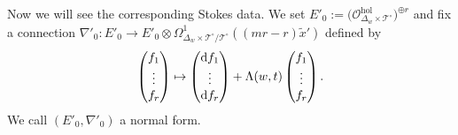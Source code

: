 \documentclass[pdftex]{sigma}
\numberwithin{equation}{section}
\begin{document}
Now we will see the corresponding Stokes data.
We set
$E'_0 :=
\big( {\mathcal O}_{\Delta_w\times {\mathcal T^{\circ}}}^{\mathrm{hol}}\big)^{\oplus r}$
and fix a connection
$\nabla'_0 \colon
E'_0 \longrightarrow E'_0 \otimes
\Omega^1_{\Delta_w\times {\mathcal T^{\circ}}/{\mathcal T^{\circ}}} ((mr-r)\tilde{x}')$
defined by
\[
 \begin{pmatrix} f_1 \\ \vdots \\ f_r \end{pmatrix}
 \mapsto
 \begin{pmatrix} {\rm d} f_1 \\ \vdots \\ {\rm d} f_r \end{pmatrix}
 +
 \Lambda(w,t)
 \begin{pmatrix} f_1 \\ \vdots \\ f_r \end{pmatrix}.
\]
We call $(E'_0,\nabla'_0)$ a normal form.
\end{document}
